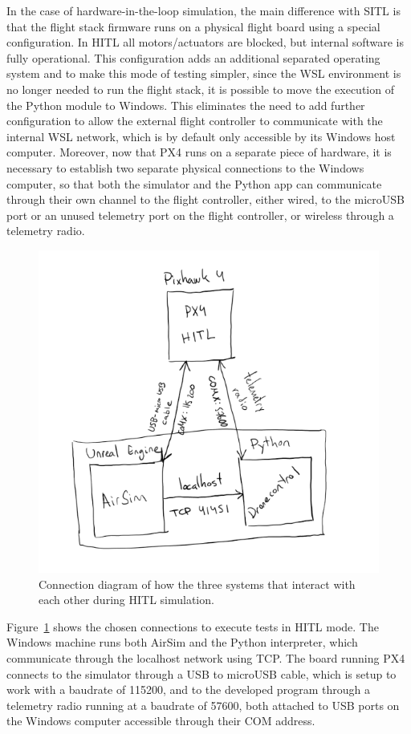 In the case of hardware-in-the-loop simulation, the main difference with SITL is that the flight stack firmware runs on a physical flight board using a special configuration.
In HITL all motors/actuators are blocked, but internal software is fully operational.
This configuration adds an additional separated operating system and to make this mode of testing simpler, since the WSL environment is no longer needed to run the flight stack, it is possible to move the execution of the Python module to Windows.
This eliminates the need to add further configuration to allow the external flight controller to communicate with the internal WSL network, which is by default only accessible by its Windows host computer.
Moreover, now that PX4 runs on a separate piece of hardware, it is necessary to establish two separate physical connections to the Windows computer, so that both the simulator and the Python app can communicate through their own channel to the flight controller, either wired, to the microUSB port or an unused telemetry port on the flight controller, or wireless through a telemetry radio.

\begin{figure}
  \centering
  \includegraphics[scale=0.8,keepaspectratio]{img/hitl-connections.png}
  \caption{Connection diagram of how the three systems that interact with each other during HITL simulation.}\label{fig:hitl-connections}
\end{figure}
Figure~\ref{fig:hitl-connections} shows the chosen connections to execute tests in HITL mode.
The Windows machine runs both AirSim and the Python interpreter, which communicate through the localhost network using \gls{TCP}.
The board running PX4 connects to the simulator through a USB to microUSB cable, which is setup to work with a baudrate of 115200, and to the developed program through a telemetry radio running at a baudrate of 57600, both attached to USB ports on the Windows computer accessible through their COM address.

